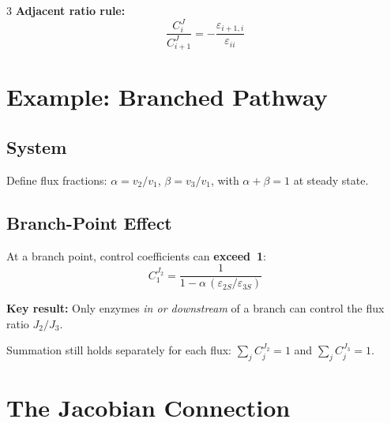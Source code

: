 \documentclass[10pt,landscape,a4paper]{article}
\begin{document}
\begin{multicols}{3}
\textbf{Adjacent ratio rule:}
\[
  \frac{C_i^J}{C_{i+1}^J} = -\frac{\varepsilon_{i+1,i}}{\varepsilon_{ii}}
\]

\section{Example: Branched Pathway}

\subsection{System}

\begin{center}
\end{center}

Define flux fractions: $\alpha = v_2/v_1$, $\beta = v_3/v_1$,
with $\alpha + \beta = 1$ at steady state.

\subsection{Branch-Point Effect}

At a branch point, control coefficients can \textbf{exceed~1}:
\[
  C_1^{J_2} = \frac{1}{1 - \alpha\,(\varepsilon_{2S}/\varepsilon_{3S})}
\]

\textbf{Key result:} Only enzymes \emph{in or downstream} of a branch
can control the flux ratio $J_2/J_3$.

Summation still holds separately for each flux:
$\sum_j C_j^{J_2} = 1$ and $\sum_j C_j^{J_3} = 1$.

\section{The Jacobian Connection}


\end{multicols}
\end{document}
